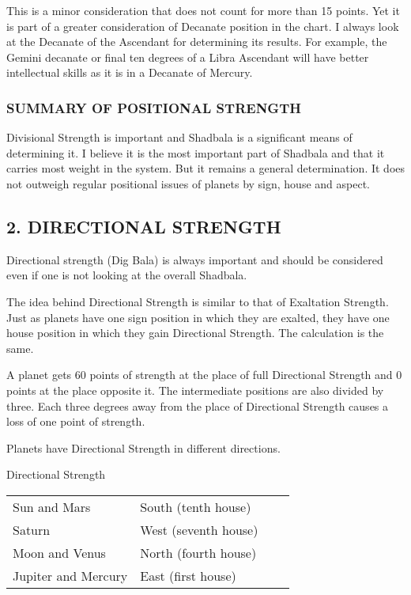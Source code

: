 This is a minor consideration that does not count for more than 15 points. Yet it is part of a greater consideration of Decanate position in the chart. I always look at the Decanate of the Ascendant for determining its results. For example, the Gemini decanate or final ten degrees of a Libra Ascendant will have better intellectual skills as it is in a Decanate of Mercury.

 

\subsubsection{SUMMARY OF POSITIONAL STRENGTH}

 

Divisional Strength is  important and Shadbala is a significant means of determining it. I believe it is the most important part of Shadbala and that it carries most weight in the system. But it remains a general determination. It does not outweigh regular positional issues of planets by sign, house and aspect.

 

\subsection{2. DIRECTIONAL STRENGTH}
 

Directional strength (Dig Bala) is always important and should be considered even if one is not looking at the overall Shadbala.

The  idea behind Directional Strength is similar to that of Exaltation Strength. Just as planets have one sign position in which they are exalted, they have one house position in which they gain Directional Strength. The calculation is the same.

 

A planet gets 60 points of strength at the place of full Directional Strength and 0 points at the place opposite it. The intermediate positions are also divided by three. Each three degrees away from the place of Directional Strength causes a loss of one point of strength.

Planets have Directional Strength in different directions.

Directional Strength

\begin{center}
\begin{tabular}{ l l l l}
Sun and Mars	  &South (tenth house)            \\
Saturn	  &West (seventh house)            \\
Moon and Venus	 & North (fourth house)            \\
Jupiter and Mercury	  &East (first house)            \\
  \end{tabular}
\end{center}

